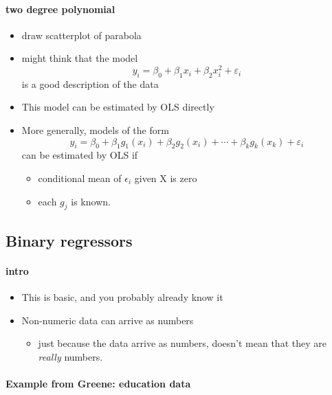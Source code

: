 \paragraph{two degree polynomial}
\label{sec-1-1-2}

\begin{itemize}
\item draw scatterplot of parabola
\item might think that the model
        \[y_i = \beta_0 + \beta_1 x_i + \beta_2 x_i^2 +
        \varepsilon_i\]
        is a good description of the data
\item This model can be estimated by OLS directly
\item More generally, models of the form
        \[y_i = \beta_0 + \beta_1 g_1(x_i) + \beta_2 g_2(x_i) + \cdots +
        \beta_k g_k(x_k) + \varepsilon_i\]
        can be estimated by OLS if
\begin{itemize}
\item conditional mean of $\epsilon$$_i$ given X is zero
\item each $g_j$ is known.
\end{itemize}
\end{itemize}
\subsection{Binary regressors}
\label{sec-1-2}
\paragraph{intro}
\label{sec-1-2-1}

\begin{itemize}
\item This is basic, and you probably already know it
\item Non-numeric data can arrive as numbers
\begin{itemize}
\item just because the data arrive as numbers, doesn't mean that
          they are \emph{really} numbers.
\end{itemize}
\end{itemize}
\paragraph{Example from Greene: education data}
\label{sec-1-2-2}

